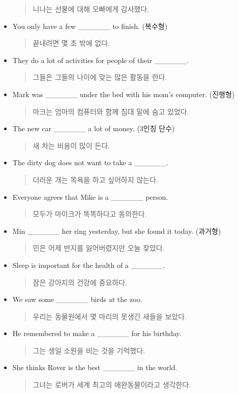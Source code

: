 \documentclass{article}
\begin{document}
\begin{addmargin}[1em]{1em}
\begin{itemize}
\begin{quote}
    니나는 선물에 대해 오빠에게 감사했다.
    \end{quote}
    \item You only have a few \_\_\_\_\_\_ to finish. (복수형)
    \begin{quote}
    끝내려면 몇 초 밖에 없다.
    \end{quote}
    \item They do a lot of activities for people of their \_\_\_\_\_\_.
    \begin{quote}
    그들은 그들의 나이에 맞는 많은 활동을 한다.
    \end{quote}
    \item Mark was \_\_\_\_\_\_ under the bed with his mom's computer. (진행형)
    \begin{quote}
    마크는 엄마의 컴퓨터와 함께 침대 밑에 숨고 있었다.
    \end{quote}
    \item The new car \_\_\_\_\_\_ a lot of money. (3인칭 단수)
    \begin{quote}
    새 차는 비용이 많이 든다.
    \end{quote}
    \item The dirty dog does not want to take a \_\_\_\_\_\_.
    \begin{quote}
    더러운 개는 목욕을 하고 싶어하지 않는다.
    \end{quote}
    \item Everyone agrees that Mike is a \_\_\_\_\_\_ person.
    \begin{quote}
    모두가 마이크가 똑똑하다고 동의한다.
    \end{quote}
    \item Min \_\_\_\_\_\_ her ring yesterday, but she found it today. (과거형)
    \begin{quote}
    민은 어제 반지를 잃어버렸지만 오늘 찾았다.
    \end{quote}
    \item Sleep is important for the health of a \_\_\_\_\_\_.
    \begin{quote}
    잠은 강아지의 건강에 중요하다.
    \end{quote}
    \item We saw some \_\_\_\_\_\_ birds at the zoo.
    \begin{quote}
    우리는 동물원에서 몇 마리의 못생긴 새들을 보았다.
    \end{quote}
    \item He remembered to make a \_\_\_\_\_\_ for his birthday.
    \begin{quote}
    그는 생일 소원을 비는 것을 기억했다.
    \end{quote}
    \item She thinks Rover is the best \_\_\_\_\_\_ in the world.
    \begin{quote}
    그녀는 로버가 세계 최고의 애완동물이라고 생각한다.
    \end{quote}
\end{itemize}
\end{addmargin}
\end{document}

